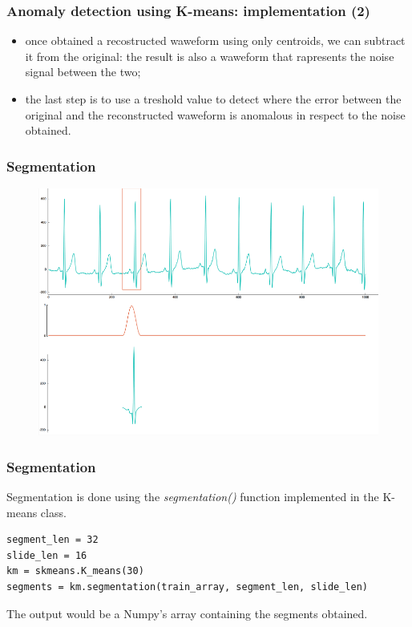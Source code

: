 \documentclass[xcolor ={table,usenames,dvipsnames}]{beamer}
\theoremstyle{definition}
\begin{document}
	\begin{frame}
		\frametitle{Anomaly detection using K-means: implementation (2)}
		\begin{itemize}
			\item once obtained a recostructed waweform using only centroids, we can subtract it from the original: the result is also a waweform that rapresents the noise signal between the two;
			\item the last step is to use a treshold value to detect where the error between the original and the reconstructed waweform is anomalous in respect to the noise obtained. 
		\end{itemize}
	\end{frame}

	\begin{frame}
		\frametitle{Segmentation}
		\begin{figure}[h!]
			\centering
			\includegraphics[scale=0.25]{img/segmentation.png}
		\end{figure}
	\end{frame}

	\begin{frame}[fragile]
		\frametitle{Segmentation}
		
		Segmentation is done using the \textit{segmentation()} function implemented in the K-means class.
		
		\begin{lstlisting}
segment_len = 32
slide_len = 16
km = skmeans.K_means(30)
segments = km.segmentation(train_array, segment_len, slide_len)
		\end{lstlisting}
		
		The output would be a Numpy's array containing the segments obtained.
			 
		\end{frame}
\end{document}
